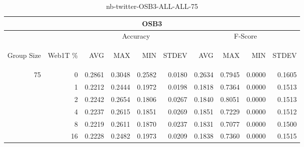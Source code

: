 \begin{center}
\begin{table}[htbp]
\begin{tabular}{ | r | r | r | r | r | r | r | r | r | r |}
\hline
\multicolumn{10}{|c|}{OSB3}\\
\hline
 & & \multicolumn{4}{|c|}{Accuracy} & \multicolumn{4}{|c|}{F-Score}\\ \cline{3-10}
\begin{sideways}Group Size\end{sideways} & \begin{sideways}Web1T \%\end{sideways} & \begin{sideways}AVG\end{sideways} & \begin{sideways}MAX\end{sideways} & \begin{sideways}MIN\end{sideways} & \begin{sideways}STDEV\end{sideways} & \begin{sideways}AVG\end{sideways} & \begin{sideways}MAX\end{sideways} & \begin{sideways}MIN\end{sideways} & \begin{sideways}STDEV\end{sideways}\\
\hline
\multirow{5}{*}{75}
 & 0 & 0.2861 & 0.3048 & 0.2582 & 0.0180 & 0.2634 & 0.7945 & 0.0000 & 0.1605\\ \cline{2-10}
 & 1 & 0.2212 & 0.2444 & 0.1972 & 0.0198 & 0.1818 & 0.7364 & 0.0000 & 0.1513\\ \cline{2-10}
 & 2 & 0.2242 & 0.2654 & 0.1806 & 0.0267 & 0.1840 & 0.8051 & 0.0000 & 0.1513\\ \cline{2-10}
 & 4 & 0.2237 & 0.2615 & 0.1851 & 0.0269 & 0.1851 & 0.7229 & 0.0000 & 0.1512\\ \cline{2-10}
 & 8 & 0.2219 & 0.2611 & 0.1870 & 0.0237 & 0.1831 & 0.7077 & 0.0000 & 0.1500\\ \cline{2-10}
 & 16 & 0.2228 & 0.2482 & 0.1973 & 0.0209 & 0.1838 & 0.7360 & 0.0000 & 0.1515\\ \cline{2-10}
\hline
\end{tabular}
\caption{nb-twitter-OSB3-ALL-ALL-75}
\label{table:nb-twitter-OSB3-ALL-ALL-75}
\end{table}
\end{center}

